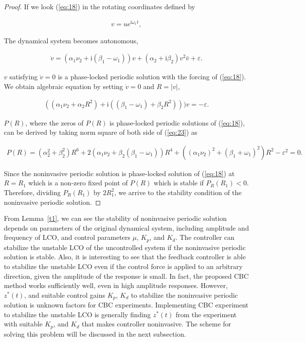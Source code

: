 \documentclass[openacc]{rsproca_new}%
\def\epsilon{\varepsilon}
\newcommand{\Eref}[1]{(\ref{#1})}
\newcommand{\Lref}[1]{Lemma~\ref{#1}}
\begin{document}
\begin{proof}
If we look \Eref{eq:18} in the rotating coordinates defined by

\begin{align}\label{eq:21}
  v=ue^{\textrm{i}\omega_1 t},
\end{align}

\noindent The dynamical system becomes autonomous,

\begin{align}\label{eq:22}
  \dot v=(\alpha_1 \nu_2+\textrm{i}(\beta_1-\omega_1))v+(\alpha_2+\textrm{i}\beta_2)v^2\bar{v}+\epsilon.
\end{align}

\noindent $v$ satisfying $\dot v=0$ is a phase-locked periodic solution with the forcing of \Eref{eq:18}. We obtain algebraic equation by setting $\dot v=0$ and $R=|v|$,

\begin{align}\label{eq:23}
  ((\alpha_1\nu_2+\alpha_2R^2)+\textrm{i}((\beta_1-\omega_1)+\beta_2 R^2)))v=-\epsilon.
\end{align}

\noindent $P(R)$, where the zeros of $P(R)$ is phase-locked periodic solutions of \Eref{eq:18}, can be derived by taking norm square of both side of \Eref{eq:23} as

\begin{align}\label{eq:24}
  P(R)=(\alpha_2^2+\beta_2^2)R^6+2(\alpha_1 \nu_2+\beta_2(\beta_1-\omega_1))R^4+((\alpha_1 \nu_2)^2+(\beta_1+\omega_1)^2)R^2-\epsilon^2=0.
\end{align}

\noindent Since the noninvasive periodic solution is phase-locked solution of \Eref{eq:18} at $R=R_1$ which is a non-zero fixed point of $P(R)$ which is stable if $P_R(R_1)<0$. Therefore, dividing $P_R(R_1)$ by $2R_1^2$, we arrive to the stability condition of the noninvasive periodic solution.
\end{proof}

\noindent From \Lref{t1}, we can see the stability of noninvasive periodic solution depends on parameters of the original dynamical system, including amplitude and frequency of LCO, and control parameters $\mu$, $K_p$, and $K_d$. The controller can stabilize the unstable LCO of the uncontrolled system if the noninvasive periodic solution is stable. Also, it is interesting to see that the feedback controller is able to stabilize the unstable LCO even if the control force is applied to an arbitrary direction, given the amplitude of the response is small. In fact, the proposed CBC method works sufficiently well, even in high amplitude responses. However, $z^*(t)$, and suitable control gains $K_p$, $K_d$ to stabilize the noninvasive periodic solution is unknown factors for CBC experiments. Implementing CBC experiment to stabilize the unstable LCO is generally finding $z^*(t)$ from the experiment with suitable $K_p$, and $K_d$ that makes controller noninvasive. The scheme for solving this problem will be discussed in the next subsection.
\end{document}
